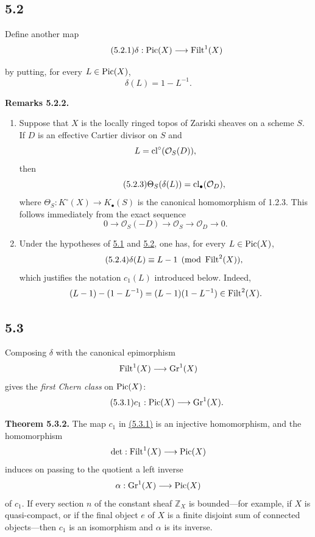 \subsection*{5.2}
Define another map
\begin{equation}\tag{5.2.1}
\delta:\operatorname{Pic}(X)\longrightarrow\operatorname{Filt}^1(X)
\end{equation}

by putting, for every $L\in\operatorname{Pic}(X)$,
\[
\delta(L)=1-L^{-1}.
\]

\textbf{Remarks 5.2.2.}
\begin{enumerate}[label=\alph*)]
\item Suppose that $X$ is the locally ringed topos of Zariski sheaves on a
scheme $S$. If $D$ is an effective Cartier divisor on $S$ and
\[
L=\operatorname{cl}^\circ(\mathcal O_S(D)),
\]
then
\begin{equation}\tag{5.2.3}
\Theta_S(\delta(L))=\operatorname{cl}_\bullet(\mathcal O_D),
\end{equation}
where $\Theta_S:K^\circ(X)\to K_\bullet(S)$ is the canonical homomorphism of
1.2.3. This follows immediately from the exact sequence
\[
0\longrightarrow\mathcal O_S(-D)\longrightarrow\mathcal O_S
\longrightarrow\mathcal O_D\longrightarrow0.
\]

\item Under the hypotheses of \hyperlink{sga6.e10.sec.5.1}{5.1} and \hyperlink{sga6.e10.sec.5.2}{5.2}, one has, for every
$L\in\operatorname{Pic}(X)$,
\begin{equation}\tag{5.2.4}
\delta(L)\equiv L-1\pmod{\operatorname{Filt}^2(X)},
\end{equation}
which justifies the notation $c_1(L)$ introduced below. Indeed,
\[
(L-1)-(1-L^{-1})=(L-1)(1-L^{-1})\in\operatorname{Filt}^2(X).
\]
\end{enumerate}

\subsection*{5.3}
Composing $\delta$ with the canonical epimorphism
\[
\operatorname{Filt}^1(X)\longrightarrow\operatorname{Gr}^1(X)
\]
gives the \emph{first Chern class} on $\operatorname{Pic}(X)$:
\begin{equation}\tag{5.3.1}
c_1:\operatorname{Pic}(X)\longrightarrow\operatorname{Gr}^1(X).
\end{equation}

\textbf{Theorem 5.3.2.}
The map $c_1$ in \hyperlink{sga6.e10.eq.5-3-1}{(5.3.1)} is an injective homomorphism, and the homomorphism
\[
\det:\operatorname{Filt}^1(X)\longrightarrow\operatorname{Pic}(X)
\]
induces on passing to the quotient a left inverse
\[
\alpha:\operatorname{Gr}^1(X)\longrightarrow\operatorname{Pic}(X)
\]
of $c_1$. If every section $n$ of the constant sheaf $\mathbb Z_X$ is
bounded---for example, if $X$ is quasi-compact, or if the final object $e$ of
$X$ is a finite disjoint sum of connected objects---then $c_1$ is an
isomorphism and $\alpha$ is its inverse.

